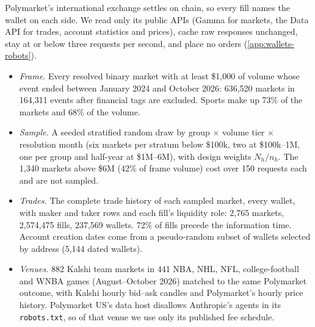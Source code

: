 Polymarket's international exchange settles on chain, so every fill names the wallet on each side. We read
only its public APIs (Gamma for markets, the Data API for trades, account statistics and prices), cache raw
responses unchanged, stay at or below three requests per second, and place no orders
(\cref{app:wallets-robots}).
\begin{itemize}
  \item \emph{Frame.} Every resolved binary market with at least \$1{,}000 of volume whose event ended between
    January 2024 and October 2026: 636{,}520 markets in 164{,}311 events after financial tags are excluded.
    Sports make up 73\% of the markets and 68\% of the volume.
  \item \emph{Sample.} A seeded stratified random draw by group $\times$ volume tier $\times$ resolution month (six
    markets per stratum below \$100k, two at \$100k--1M, one per group and half-year at \$1M--6M), with
    design weights $N_h/n_h$. The 1{,}340 markets above \$6M (42\% of frame volume) cost over 150 requests
    each and are not sampled.
  \item \emph{Trades.} The complete trade history of each sampled market, every wallet, with maker and taker
    rows and each fill's liquidity role: 2{,}765 markets, 2{,}574{,}475 fills, 237{,}569 wallets. 72\%
    of fills precede the information time. Account creation dates come from a pseudo-random subset of
    wallets selected by address (5{,}144 dated wallets).
  \item \emph{Venues.} 882 Kalshi team markets in 441 NBA, NHL, NFL, college-football and WNBA games
    (August--October 2026) matched to the same Polymarket outcome, with Kalshi hourly bid--ask candles and
    Polymarket's hourly price history. Polymarket US's data host disallows Anthropic's agents in its
    \texttt{robots.txt}, so of that venue we use only its published fee schedule.
\end{itemize}
